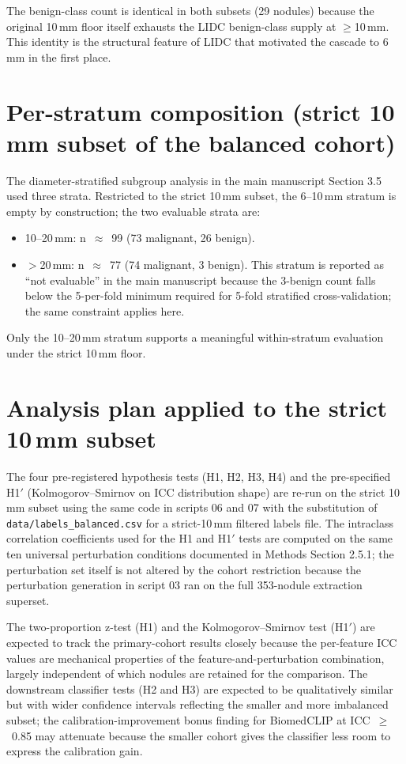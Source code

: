 \documentclass[11pt,a4paper]{article}
\begin{document}
The benign-class count is identical in both subsets (29 nodules) because the original 10\,mm floor itself exhausts the LIDC benign-class supply at $\geq$10\,mm. This identity is the structural feature of LIDC that motivated the cascade to 6\,mm in the first place.

\section*{Per-stratum composition (strict 10\,mm subset of the balanced cohort)}

The diameter-stratified subgroup analysis in the main manuscript Section 3.5 used three strata. Restricted to the strict 10\,mm subset, the 6--10\,mm stratum is empty by construction; the two evaluable strata are:

\begin{itemize}
    \item 10--20\,mm: n~$\approx$~99 (73 malignant, 26 benign).
    \item $>$20\,mm: n~$\approx$~77 (74 malignant, 3 benign). This stratum is reported as ``not evaluable'' in the main manuscript because the 3-benign count falls below the 5-per-fold minimum required for 5-fold stratified cross-validation; the same constraint applies here.
\end{itemize}

Only the 10--20\,mm stratum supports a meaningful within-stratum evaluation under the strict 10\,mm floor.

\section*{Analysis plan applied to the strict 10\,mm subset}

The four pre-registered hypothesis tests (H1, H2, H3, H4) and the pre-specified H1$'$ (Kolmogorov--Smirnov on ICC distribution shape) are re-run on the strict 10\,mm subset using the same code in scripts 06 and 07 with the substitution of \texttt{data/labels\_balanced.csv} for a strict-10\,mm filtered labels file. The intraclass correlation coefficients used for the H1 and H1$'$ tests are computed on the same ten universal perturbation conditions documented in Methods Section 2.5.1; the perturbation set itself is not altered by the cohort restriction because the perturbation generation in script 03 ran on the full 353-nodule extraction superset.

The two-proportion z-test (H1) and the Kolmogorov--Smirnov test (H1$'$) are expected to track the primary-cohort results closely because the per-feature ICC values are mechanical properties of the feature-and-perturbation combination, largely independent of which nodules are retained for the comparison. The downstream classifier tests (H2 and H3) are expected to be qualitatively similar but with wider confidence intervals reflecting the smaller and more imbalanced subset; the calibration-improvement bonus finding for BiomedCLIP at ICC~$\geq$~0.85 may attenuate because the smaller cohort gives the classifier less room to express the calibration gain.
\end{document}
